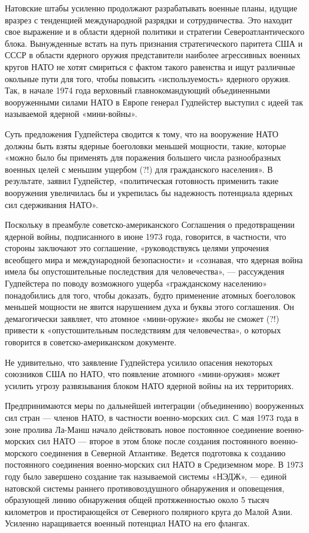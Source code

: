 \documentclass[12pt, a4paper, openany]{book}
\begin{document}
	Натовские штабы усиленно продолжают разрабатывать военные планы, идущие вразрез с тенденцией международной разрядки и сотрудничества. Это находит свое выражение и в области ядерной политики и стратегии Североатлантического блока. Вынужденные встать на путь признания стратегического паритета США и СССР в области ядерного оружия представители наиболее агрессивных военных кругов НАТО не хотят смириться с фактом такого равенства и ищут различные окольные пути для того, чтобы повысить «используемость» ядерного оружия. Так, в начале 1974 года верховный главнокомандующий объединенными вооруженными силами НАТО в Европе генерал Гудпейстер выступил с идеей так называемой ядерной «мини-войны».
	
	Суть предложения Гудпейстера сводится к тому, что на вооружение НАТО должны быть взяты ядерные боеголовки меньшей мощности, такие, которые «можно было бы применять для поражения большего числа разнообразных военных целей с меньшим ущербом (?!) для гражданского населения». В результате, заявил Гудпейстер, «политическая готовность применить такие вооружения увеличилась бы и укрепилась бы надежность потенциала ядерных сил сдерживания НАТО».
	
	Поскольку в преамбуле советско-американского Соглашения о предотвращении ядерной войны, подписанного в июне 1973 года, говорится, в частности, что стороны заключают это соглашение, «руководствуясь целями упрочения всеобщего мира и международной безопасности» и «сознавая, что ядерная война имела бы опустошительные последствия для человечества», — рассуждения Гудпейстера по поводу возможного ущерба «гражданскому населению» понадобились для того, чтобы доказать, будто применение атомных боеголовок меньшей мощности не явится нарушением духа и буквы этого соглашения. Он демагогически заявляет, что атомное «мини-оружие» якобы не сможет (?!) привести к «опустошительным последствиям для человечества», о которых говорится в советско-американском документе.
	
	Не удивительно, что заявление Гудпейстера усилило опасения некоторых союзников США по НАТО, что появление атомного «мини-оружия» может усилить угрозу развязывания блоком НАТО ядерной войны на их территориях.
	
	Предпринимаются меры по дальнейшей интеграции (объединению) вооруженных сил стран — членов НАТО, в частности военно-морских сил. С мая 1973 года в зоне пролива Ла-Манш начало действовать новое постоянное соединение военно-морских сил НАТО — второе в этом блоке после создания постоянного военно-морского соединения в Северной Атлантике. Ведется подготовка к созданию постоянного соединения военно-морских сил НАТО в Средиземном море. В 1973 году было завершено создание так называемой системы «НЭДЖ», — единой натовской системы раннего противовоздушного обнаружения и оповещения, образующей линию обнаружения общей протяженностью около 5 тысяч километров и простирающейся от Северного полярного круга до Малой Азии. Усиленно наращивается военный потенциал НАТО на его флангах.
	
\end{document}
